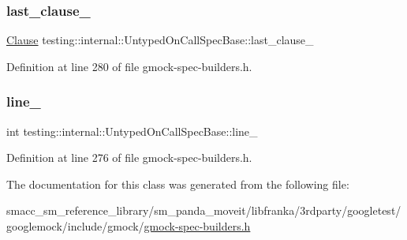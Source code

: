 \subsubsection{\texorpdfstring{last\+\_\+clause\+\_\+}{last\_clause\_}}
{\footnotesize\ttfamily \hyperlink{classtesting_1_1internal_1_1UntypedOnCallSpecBase_a78ebf16bfee40375e33a983f3100f354}{Clause} testing\+::internal\+::\+Untyped\+On\+Call\+Spec\+Base\+::last\+\_\+clause\+\_\+\hspace{0.3cm}{\ttfamily [protected]}}



Definition at line 280 of file gmock-\/spec-\/builders.\+h.

\mbox{\label{classtesting_1_1internal_1_1UntypedOnCallSpecBase_a1dfa0dafaae6697f17adf5d837ca77c7}} 
\subsubsection{\texorpdfstring{line\+\_\+}{line\_}}
{\footnotesize\ttfamily int testing\+::internal\+::\+Untyped\+On\+Call\+Spec\+Base\+::line\+\_\+\hspace{0.3cm}{\ttfamily [protected]}}



Definition at line 276 of file gmock-\/spec-\/builders.\+h.



The documentation for this class was generated from the following file\+:\begin{DoxyCompactItemize}
\item 
smacc\+\_\+sm\+\_\+reference\+\_\+library/sm\+\_\+panda\+\_\+moveit/libfranka/3rdparty/googletest/googlemock/include/gmock/\hyperlink{gmock-spec-builders_8h}{gmock-\/spec-\/builders.\+h}\end{DoxyCompactItemize}
